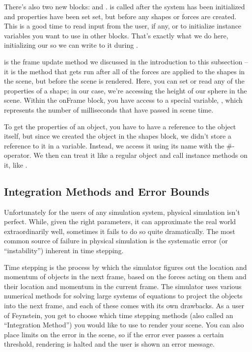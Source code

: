 There's also two new blocks:  and
.  is called after the system has been
initialized and properties have been set set, but before any shapes or
forces are created. This is a good time to read input from the user,
if any, or to initialize instance variables you want to use in other
blocks. That's exactly what we do here, initializing our
 so we can write to it during .

 is the frame update method we discussed in the introduction
to this subsection -- it is the method that gets run after all of the
forces are applied to the shapes in the scene, but before the scene is
rendered. Here, you can set or read any of the properties of a shape;
in our case, we're accessing the height of our sphere in the
scene. Within the onFrame block, you have access to a special
variable, , which represents the number of milliseconds that
have passed in scene time.

To get the properties of an object, you have to have a reference to
the object itself, but since we created the object in the shapes
block, we didn't store a reference to it in a variable. Instead, we
access it using its name with the \#-operator. We then can treat it
like a regular object and call instance methods on it, like
.

\subsection{Integration Methods and Error Bounds}

Unfortunately for the users of any simulation system, physical
simulation isn't perfect. While, given the right parameters, it can
approximate the real world extraordinarily well, sometimes it fails to
do so quite dramatically. The most common source of failure in
physical simulation is the systematic error (or ``instability'')
inherent in time stepping.

Time stepping is the process by which the simulator figures out the
location and momentum of objects in the next frame, based on the
forces acting on them and their location and momentum in the current
frame. The simulator uses various numerical methods for solving large
systems of equations to project the objects into the next frame, and
each of these comes with its own drawbacks. As a user of Feynstein,
you get to choose which time stepping methods (also called an
“Integration Method”) you would like to use to render your scene. You
can also place limits on the error in the scene, so if the error ever
passes a certain threshold, rendering is halted and the user is shown
an error message.

